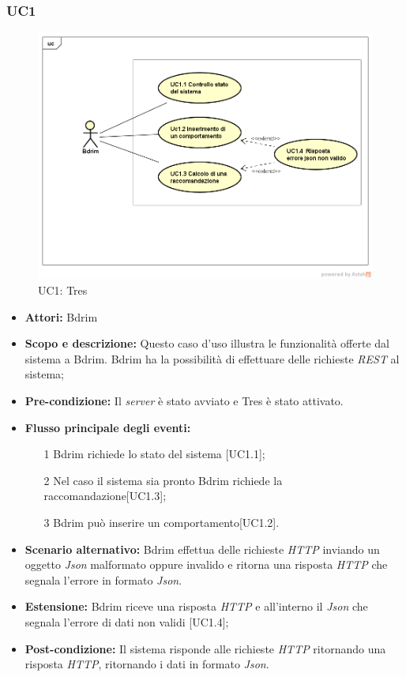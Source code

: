 \subsubsection{UC1}
\begin{figure}[h]
\centering
\includegraphics[scale=0.42]{immagini/UC1a}
\caption{UC1: Tres}
\label{fig:UC1}
\end{figure}
\begin{itemize}
\item \textbf{Attori:} Bdrim
\item \textbf{Scopo e descrizione:} Questo caso d'uso illustra le funzionalità offerte dal sistema a Bdrim. Bdrim ha la possibilità di effettuare delle richieste \emph{REST} al sistema;
\item \textbf{Pre-condizione:} Il \emph{server} è stato avviato e Tres è stato attivato.
\item \textbf{Flusso principale degli eventi:}
\begin{itemize}
\item[1] Bdrim richiede lo stato del sistema [UC1.1];
\item[2] Nel caso il sistema sia pronto Bdrim richiede la raccomandazione[UC1.3];
\item[3] Bdrim può inserire un comportamento[UC1.2].
\end{itemize}
\item \textbf{Scenario alternativo:} Bdrim effettua delle richieste \emph{HTTP} inviando un oggetto \emph{Json} malformato oppure invalido e ritorna una risposta \emph{HTTP} che segnala l'errore in formato \emph{Json}. 
\item \textbf{Estensione:} Bdrim riceve una risposta \emph{HTTP} e all'interno il \emph{Json} che segnala l'errore di dati non validi [UC1.4];
\item \textbf{Post-condizione:} Il sistema risponde alle richieste \emph{HTTP} ritornando una risposta \emph{HTTP}, ritornando i dati in formato \emph{Json}.
\end{itemize}




